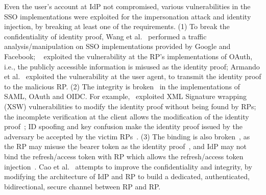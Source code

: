 Even the user's account at IdP not compromised, various vulnerabilities in the SSO implementations were exploited for the impersonation attack and identity injection, by
 breaking at least one of the requirements. %
(1) To break the confidentiality of identity proof,  Wang et al.~\cite{WangCW12} performed a traffic analysis/manipulation on SSO implementations provided by Google and Facebook; ~\cite{ZhouE14,WangZLG16,YangLLZH16} exploited the vulnerability at the RP's implementations of OAuth, i.e., the publicly accessible information is misused as the identity proof;
Armando et al.~\cite{ArmandoCCCPS13} exploited the vulnerability at the user agent, to transmit the identity proof to the malicious RP.
(2) The integrity is broken~\cite{SomorovskyMSKJ12,WangCW12,ZhouE14,WangZLG16,YangLLZH16,MainkaMS16, MainkaMSW17} in the implementations of  SAML, OAuth and OIDC.
For example,~\cite{SomorovskyMSKJ12} exploited XML Signature wrapping (XSW) vulnerabilities to modify the identity proof without being found by RPs;
the incomplete verification at the client allows the modification of the identity proof~\cite{ZhouE14,WangZLG16,YangLLZH16};
ID spoofing and key confusion make the identity proof issued by the adversary be accepted by the victim RPs~\cite{MainkaMS16, MainkaMSW17}.
(3) The binding is also broken~\cite{ZhouE14,WangZLG16,YangLLZH16,YangLCZ18}, as the RP may misuse the bearer token  as the identity proof~\cite{ZhouE14,WangZLG16,YangLLZH16}, and IdP may not bind the refresh/access token with RP which allows the refresh/access token injection~\cite{YangLCZ18}.
Cao et al.~\cite{CaoSBKVC14} attempts to improve the confidentiality and integrity, by modifying the architecture of IdP and RP to
 build a dedicated, authenticated, bidirectional, secure channel between RP and RP.


